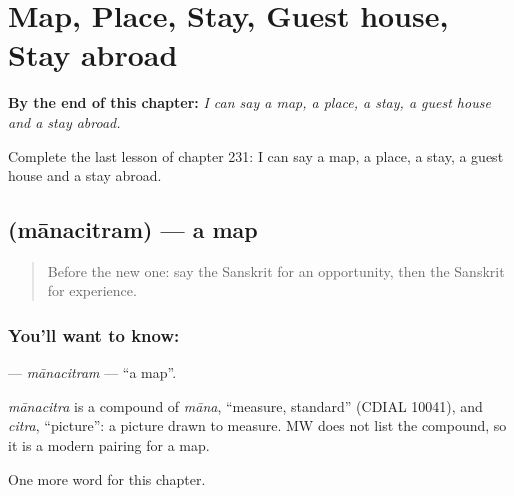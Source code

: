 
\chapter{Map, Place, Stay, Guest house, Stay abroad}
\label{ch:sa-map-place-stay-guest-house-stay-abroad}

\begin{chapteropening}
\textbf{By the end of this chapter:} \emph{I can say a map, a place, a stay, a guest house and a stay abroad.}

Complete the last lesson of chapter 231: I can say a map, a place, a stay, a guest house and a stay abroad.
\end{chapteropening}

\section[\texorpdfstring{\sk{मानचित्रम्} (mānacitram)}{मानचित्रम् (mānacitram)}]{ (mānacitram) — a map}

\label{lesson:SA-C231-manacitram}



\begin{quote}
Before the new one: say the Sanskrit for an opportunity, then the Sanskrit for experience.
\end{quote}

\subsection*{You'll want to know: }
\textbf{} — \emph{mānacitram} — \textquotedblleft{}a map\textquotedblright{}.

\begin{cousinweb}
\emph{mānacitra} is a compound of \emph{māna}, \textquotedblleft{}measure, standard\textquotedblright{} (CDIAL 10041), and \emph{citra}, \textquotedblleft{}picture\textquotedblright{}: a picture drawn to measure. MW does not list the compound, so it is a modern pairing for a map.
\end{cousinweb}

\begin{grammarlens}[title={What you've built}]
One more word for this chapter.
\end{grammarlens}

